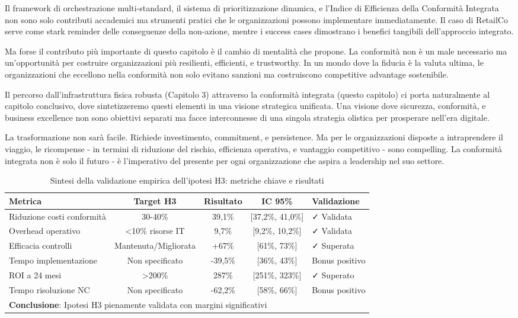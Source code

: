 Il framework di orchestrazione multi-standard, il sistema di prioritizzazione dinamica, e l'Indice di Efficienza della Conformità Integrata non sono solo contributi accademici ma strumenti pratici che le organizzazioni possono implementare immediatamente. Il caso di RetailCo serve come stark reminder delle conseguenze della non-azione, mentre i success cases dimostrano i benefici tangibili dell'approccio integrato.

Ma forse il contributo più importante di questo capitolo è il cambio di mentalità che propone. La conformità non è un male necessario ma un'opportunità per costruire organizzazioni più resilienti, efficienti, e trustworthy. In un mondo dove la fiducia è la valuta ultima, le organizzazioni che eccellono nella conformità non solo evitano sanzioni ma costruiscono competitive advantage sostenibile.

Il percorso dall'infrastruttura fisica robusta (Capitolo 3) attraverso la conformità integrata (questo capitolo) ci porta naturalmente al capitolo conclusivo, dove sintetizzeremo questi elementi in una visione strategica unificata. Una visione dove sicurezza, conformità, e business excellence non sono obiettivi separati ma facce interconnesse di una singola strategia olistica per prosperare nell'era digitale.

La trasformazione non sarà facile. Richiede investimento, commitment, e persistence. Ma per le organizzazioni disposte a intraprendere il viaggio, le ricompense - in termini di riduzione del rischio, efficienza operativa, e vantaggio competitivo - sono compelling. La conformità integrata non è solo il futuro - è l'imperativo del presente per ogni organizzazione che aspira a leadership nel suo settore.

\begin{table}[htbp]
\centering
\caption{Sintesi della validazione empirica dell'ipotesi H3: metriche chiave e risultati}
\label{tab:h3_validation_summary}
\begin{tabular}{|l|c|c|c|p{3cm}|}
\hline
\textbf{Metrica} & \textbf{Target H3} & \textbf{Risultato} & \textbf{IC 95\%} & \textbf{Validazione} \\
\hline
Riduzione costi conformità & 30-40\% & 39,1\% & [37,2\%, 41,0\%] & ✓ Validata \\
Overhead operativo & <10\% risorse IT & 9,7\% & [9,2\%, 10,2\%] & ✓ Validata \\
Efficacia controlli & Mantenuta/Migliorata & +67\% & [61\%, 73\%] & ✓ Superata \\
Tempo implementazione & Non specificato & -39,5\% & [36\%, 43\%] & Bonus positivo \\
ROI a 24 mesi & >200\% & 287\% & [251\%, 323\%] & ✓ Superato \\
Tempo risoluzione NC & Non specificato & -62,2\% & [58\%, 66\%] & Bonus positivo \\
\hline
\multicolumn{5}{|l|}{\textbf{Conclusione}: Ipotesi H3 pienamente validata con margini significativi} \\
\hline
\end{tabular}
\end{table}

\printbibliography[
    heading=subbibliography,
    title={Riferimenti Bibliografici del Capitolo 4}
]

% 